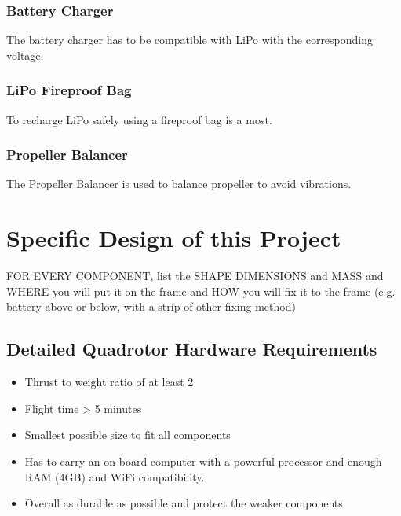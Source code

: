 \subsubsection{Battery Charger}
The battery charger has to be compatible with LiPo with the corresponding voltage.

\subsubsection{LiPo Fireproof Bag}
To recharge LiPo safely using a fireproof bag is a most.

\subsubsection{Propeller Balancer}
The Propeller Balancer is used to balance propeller to avoid vibrations.


\section{Specific Design of this Project}



FOR EVERY COMPONENT, list the SHAPE DIMENSIONS and MASS and WHERE you will put it on the frame and HOW you will fix it to the frame (e.g. battery above or below, with a strip of other fixing method)

\subsection{Detailed Quadrotor Hardware Requirements}
\begin{itemize}
    \item Thrust to weight ratio of at least 2
    \item Flight time > 5 minutes
    \item Smallest possible size to fit all components
    \item Has to carry an on-board computer with a powerful processor and enough RAM (4GB) and WiFi compatibility.
    \item Overall as durable as possible and protect the weaker components.
\end{itemize}

